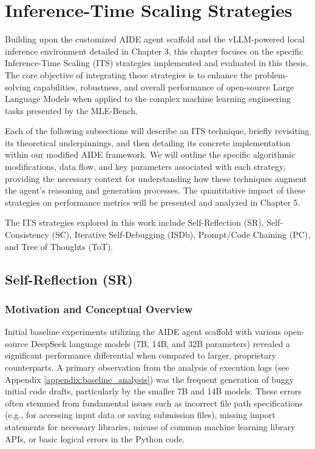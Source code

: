 \chapter{Inference-Time Scaling Strategies}

Building upon the customized AIDE agent scaffold and the vLLM-powered local inference environment detailed in Chapter 3, this chapter focuses on the specific Inference-Time Scaling (ITS) strategies implemented and evaluated in this thesis. The core objective of integrating these strategies is to enhance the problem-solving capabilities, robustness, and overall performance of open-source Large Language Models when applied to the complex machine learning engineering tasks presented by the MLE-Bench.

Each of the following subsections will describe an ITS technique, briefly revisiting its theoretical underpinnings, and then detailing its concrete implementation within our modified AIDE framework. We will outline the specific algorithmic modifications, data flow, and key parameters associated with each strategy, providing the necessary context for understanding how these techniques augment the agent's reasoning and generation processes. The quantitative impact of these strategies on performance metrics will be presented and analyzed in Chapter 5.

The ITS strategies explored in this work include Self-Reflection (SR), Self-Consistency (SC), Iterative Self-Debugging (ISDb), Prompt/Code Chaining (PC), and Tree of Thoughts (ToT).

\section{Self-Reflection (SR)}

\subsection{Motivation and Conceptual Overview}

Initial baseline experiments utilizing the AIDE agent scaffold with various open-source DeepSeek language models (7B, 14B, and 32B parameters) revealed a significant performance differential when compared to larger, proprietary counterparts. A primary observation from the analysis of execution logs (see Appendix \ref{appendix:baseline_analysis}) was the frequent generation of buggy initial code drafts, particularly by the smaller 7B and 14B models. These errors often stemmed from fundamental issues such as incorrect file path specifications (e.g., for accessing input data or saving submission files), missing import statements for necessary libraries, misuse of common machine learning library APIs, or basic logical errors in the Python code.

